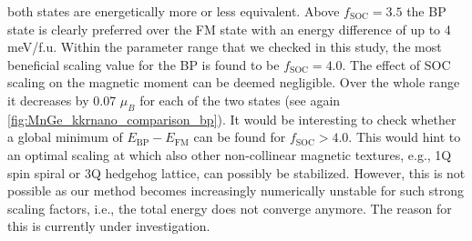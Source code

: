 \documentclass[graybox]{svmult}
\begin{document}
both states are energetically more or less equivalent.
Above $f_{\text{SOC}}=3.5$ the BP state is clearly preferred over the FM state with
an energy difference of up to 4 meV/f.u.
Within the parameter range that we checked in this study,
the most beneficial scaling value for the BP is found to be $f_{\text{SOC}}=4.0$.
The effect of SOC scaling on the magnetic moment can be deemed negligible. Over the whole
range it decreases by 0.07 $\mu_{B}$ for each of the two states
(see again \cref{fig:MnGe_kkrnano_comparison_bp}).
It would be interesting to check whether a global minimum of $E_{\text{BP}}-E_{\text{FM}}$ can
be found for $f_{\text{SOC}} > 4.0$. This would hint to an optimal
scaling at which also other non-collinear magnetic textures, e.g., 1Q spin spiral or
3Q hedgehog lattice, can possibly be stabilized.
However, this is not possible as our method becomes increasingly numerically unstable for 
such strong scaling factors, i.e., the total energy does not converge anymore.
The reason for this is currently under investigation.
\end{document}
